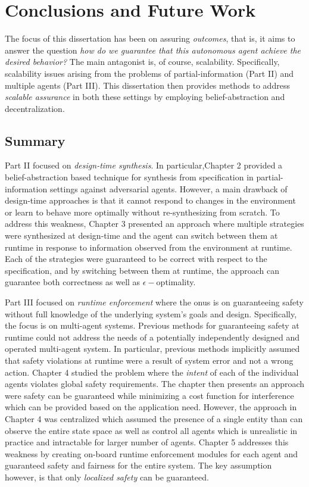 \chapter{Conclusions and Future Work}
The focus of this dissertation has been on assuring \emph{outcomes}, that is, it aims to answer the question \emph{how do we guarantee that this autonomous agent achieve the desired behavior?} The main antagonist is, of course, scalability. Specifically, scalability issues arising from the problems of partial-information (Part II) and multiple agents (Part III). This dissertation then provides methods to address \emph{scalable assurance} in both these settings by employing belief-abstraction and decentralization. 

\section{Summary}
Part II focused on \emph{design-time synthesis}. In particular,Chapter 2 provided a belief-abstraction based technique for synthesis from specification in partial-information settings against adversarial agents. However, a main drawback of design-time approaches is that it cannot respond to changes in the environment or learn to behave more optimally without re-synthesizing from scratch. To address this weakness, Chapter 3 presented an approach where multiple strategies were synthesized at design-time and the agent can switch between them at runtime in response to information observed from the environment at runtime. Each of the strategies were guaranteed to be correct with respect to the specification, and by switching between them at runtime, the approach can guarantee both correctness as well as $\epsilon-$optimality. 

Part III focused on \emph{runtime enforcement} where the onus is on guaranteeing safety without full knowledge of the underlying system's goals and design. Specifically, the focus is on multi-agent systems. Previous methods for guaranteeing safety at runtime could not address the needs of a potentially independently designed and operated multi-agent system. In particular, previous methods implicitly assumed that safety violations at runtime were a result of system error and not a wrong action. Chapter 4 studied the problem where the \emph{intent} of each of the individual agents violates global safety requirements. The chapter then presents an approach were safety can be guaranteed while minimizing a cost function for interference which can be provided based on the application need. However, the approach in Chapter 4 was centralized which assumed the presence of a single entity than can observe the entire state space as well as control all agents which is unrealistic in practice and intractable for larger number of agents. Chapter 5 addresses this weakness by creating on-board runtime enforcement modules for each agent and guaranteed safety and fairness for the entire system. The key assumption however, is that only \emph{localized safety} can be guaranteed. 

